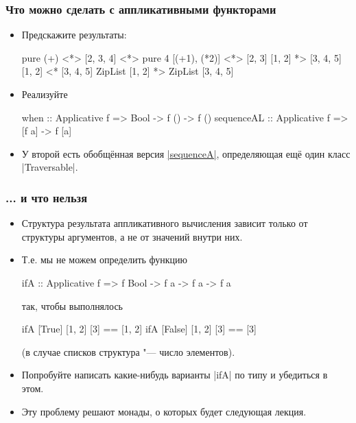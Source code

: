 \documentclass[11pt]{beamer}
\begin{document}
\begin{frame}[fragile]
  \frametitle{Что можно сделать с аппликативными функторами}
  \begin{itemize}
    \item Предскажите результаты:
          \begin{haskell}
            pure (+) <*> [2, 3, 4] <*> pure 4
            [(+1), (*2)] <*> [2, 3]
            [1, 2] *> [3, 4, 5]
            [1, 2] <* [3, 4, 5]
            ZipList [1, 2] *> ZipList [3, 4, 5]
          \end{haskell}
          \pause
    \item Реализуйте
          \begin{haskell}
            when :: Applicative f => Bool -> f () -> f ()    
            sequenceAL :: Applicative f => [f a] -> f [a]
          \end{haskell}
    \item У второй есть обобщённая версия \href{http://hackage.haskell.org/package/base/docs/Data-Traversable.html#v:sequenceA}{\haskinline|sequenceA|}, определяющая ещё один класс \haskinline|Traversable|.
  \end{itemize}
\end{frame}

\begin{frame}[fragile]
  \frametitle{... и что нельзя}
  \begin{itemize}
    \item Структура результата аппликативного вычисления зависит только от структуры аргументов, а не от значений внутри них.
    \item Т.е. мы не можем определить функцию
          \begin{haskell}
            ifA :: Applicative f => f Bool -> f a -> f a -> f a
          \end{haskell}
          так, чтобы выполнялось
          \begin{haskell}
            ifA [True]  [1, 2] [3] == [1, 2]
            ifA [False] [1, 2] [3] == [3]
          \end{haskell}
          (в случае списков структура "--- число элементов).
          \pause
    \item Попробуйте написать какие-нибудь варианты \haskinline|ifA| по типу и убедиться в этом.
          \pause
    \item Эту проблему решают монады, о которых будет следующая лекция.
  \end{itemize}
\end{frame}
\end{document}
